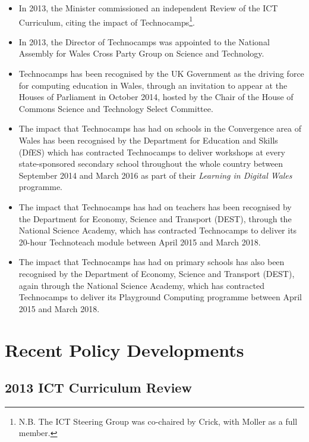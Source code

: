 \documentclass{sig-alternate}
\begin{document}
\begin{itemize}
\item
In 2013, the Minister commissioned an independent Review of the ICT
Curriculum, citing the impact of Technocamps\footnote{N.B. The ICT
Steering Group was co-chaired by Crick, with Moller as a full
member.}.

\item
In 2013, the Director of Technocamps was appointed
to the National Assembly for Wales Cross Party Group on Science and Technology.

\item
Technocamps has been recognised by the UK Government as the driving
force for computing education in Wales, through an invitation to
appear at the Houses of Parliament in October 2014, hosted by the
Chair of the House of Commons Science and Technology Select Committee.

\item
The impact that Technocamps has had on schools in the Convergence area
of Wales has been recognised by the Department for Education and Skills (DfES)
which has contracted Technocamps to deliver workshops at every
state-sponsored secondary school throughout the whole country between
September 2014 and March 2016 as part of their \emph{Learning in
Digital Wales} programme.

\item
The impact that Technocamps has had on teachers has been recognised by
the Department for Economy, Science and Transport (DEST), through the
National Science Academy, which has contracted Technocamps to deliver
its 20-hour Technoteach module between April 2015 and March 2018.

\item
The impact that Technocamps has had on primary schools has also been
recognised by the Department of Economy, Science and Transport (DEST),
again through the National Science Academy, which has contracted
Technocamps to deliver its Playground Computing programme between
April 2015 and March 2018.

\end{itemize}

\section{Recent Policy Developments}

\subsection{2013 ICT Curriculum Review}
\end{document}
